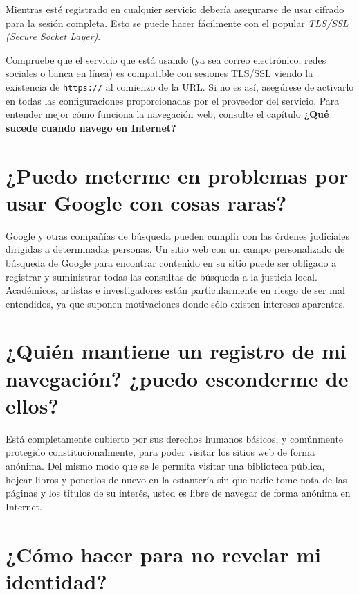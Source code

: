 \documentclass[10pt,a5paper,twoside,,]{book}
\begin{document}
Mientras esté registrado en cualquier servicio debería asegurarse de
usar cifrado para la sesión completa. Esto se puede hacer fácilmente con
el popular \emph{TLS/SSL (Secure Socket Layer)}.

Compruebe que el servicio que está usando (ya sea correo electrónico,
redes sociales o banca en línea) es compatible con sesiones TLS/SSL
viendo la existencia de \texttt{https://} al comienzo de la URL. Si no
es así, asegúrese de activarlo en todas las configuraciones
proporcionadas por el proveedor del servicio. Para entender mejor cómo
funciona la navegación web, consulte el capítulo \textbf{¿Qué sucede
cuando navego en Internet?}

\section{¿Puedo meterme en problemas por usar Google con cosas
raras?}\label{puedo-meterme-en-problemas-por-usar-google-con-cosas-raras}

Google y otras compañías de búsqueda pueden cumplir con las órdenes
judiciales dirigidas a determinadas personas. Un sitio web con un campo
personalizado de búsqueda de Google para encontrar contenido en su sitio
puede ser obligado a registrar y suministrar todas las consultas de
búsqueda a la justicia local. Académicos, artistas e investigadores
están particularmente en riesgo de ser mal entendidos, ya que suponen
motivaciones donde sólo existen intereses aparentes.

\section{¿Quién mantiene un registro de mi navegación? ¿puedo esconderme
de
ellos?}\label{quiuxe9n-mantiene-un-registro-de-mi-navegaciuxf3n-puedo-esconderme-de-ellos}

Está completamente cubierto por sus derechos humanos básicos, y
comúnmente protegido constitucionalmente, para poder visitar los sitios
web de forma anónima. Del mismo modo que se le permita visitar una
biblioteca pública, hojear libros y ponerlos de nuevo en la estantería
sin que nadie tome nota de las páginas y los títulos de su interés,
usted es libre de navegar de forma anónima en Internet.

\section{¿Cómo hacer para no revelar mi
identidad?}\label{cuxf3mo-hacer-para-no-revelar-mi-identidad}
\end{document}

